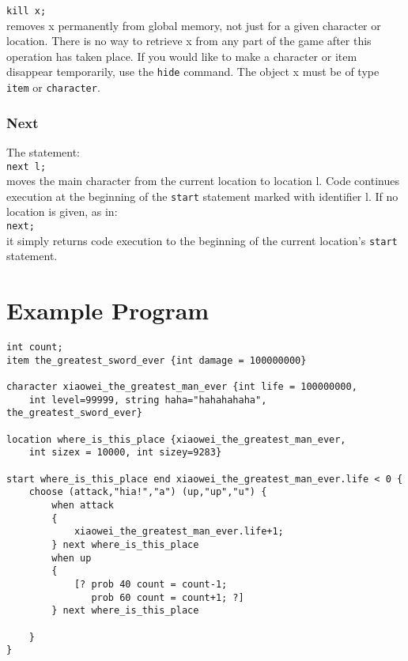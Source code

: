 \documentclass[12pt]{article}
\begin{document}
\texttt{kill x;} \\

\noindent removes x permanently from global memory, not just for a given character or location.  There is no way to retrieve x from any part of the game after this operation has taken place.  If you would like to make a character or item disappear temporarily, use the \texttt{hide} command.  The object  x must be of type \texttt{item} or \texttt{character}.

\subsubsection{Next}
The statement: \\

\texttt{next l;} \\

\noindent moves the main character from the current location to location l.  Code continues execution at the beginning of the \texttt{start} statement marked with identifier l.  If no location is given, as in: \\

\texttt{next;} \\

\noindent it simply returns code execution to the beginning of the current location's \texttt{start} statement.

\section{Example Program}

\begin{verbatim}
int count;
item the_greatest_sword_ever {int damage = 100000000}

character xiaowei_the_greatest_man_ever {int life = 100000000, 
    int level=99999, string haha="hahahahaha", the_greatest_sword_ever}

location where_is_this_place {xiaowei_the_greatest_man_ever, 
    int sizex = 10000, int sizey=9283}

start where_is_this_place end xiaowei_the_greatest_man_ever.life < 0 {
    choose (attack,"hia!","a") (up,"up","u") {
        when attack 
        {
            xiaowei_the_greatest_man_ever.life+1;
        } next where_is_this_place
        when up 
        {
            [? prob 40 count = count-1;
               prob 60 count = count+1; ?]
        } next where_is_this_place
		
    }
}
\end{verbatim}
\end{document}
